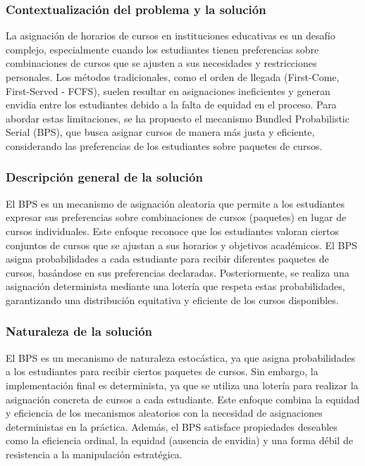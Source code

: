 \documentclass{article}
\begin{document}
\subsubsection{Contextualización del problema y la solución}

La asignación de horarios de cursos en instituciones educativas es un desafío complejo, especialmente cuando los estudiantes tienen preferencias sobre combinaciones de cursos que se ajusten a sus necesidades y restricciones personales. Los métodos tradicionales, como el orden de llegada (First-Come, First-Served - FCFS), suelen resultar en asignaciones ineficientes y generan envidia entre los estudiantes debido a la falta de equidad en el proceso. Para abordar estas limitaciones, se ha propuesto el mecanismo Bundled Probabilistic Serial (BPS), que busca asignar cursos de manera más justa y eficiente, considerando las preferencias de los estudiantes sobre paquetes de cursos.

\subsubsection{Descripción general de la solución}

El BPS es un mecanismo de asignación aleatoria que permite a los estudiantes expresar sus preferencias sobre combinaciones de cursos (paquetes) en lugar de cursos individuales. Este enfoque reconoce que los estudiantes valoran ciertos conjuntos de cursos que se ajustan a sus horarios y objetivos académicos. El BPS asigna probabilidades a cada estudiante para recibir diferentes paquetes de cursos, basándose en sus preferencias declaradas. Posteriormente, se realiza una asignación determinista mediante una lotería que respeta estas probabilidades, garantizando una distribución equitativa y eficiente de los cursos disponibles.

\subsubsection{Naturaleza de la solución}

El BPS es un mecanismo de naturaleza estocástica, ya que asigna probabilidades a los estudiantes para recibir ciertos paquetes de cursos. Sin embargo, la implementación final es determinista, ya que se utiliza una lotería para realizar la asignación concreta de cursos a cada estudiante. Este enfoque combina la equidad y eficiencia de los mecanismos aleatorios con la necesidad de asignaciones deterministas en la práctica. Además, el BPS satisface propiedades deseables como la eficiencia ordinal, la equidad (ausencia de envidia) y una forma débil de resistencia a la manipulación estratégica.
\end{document}
